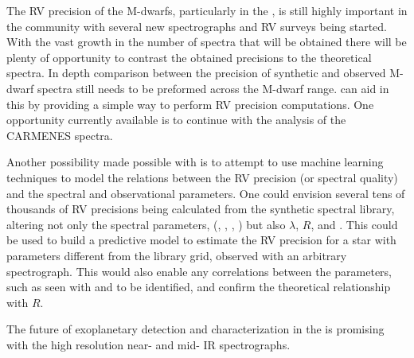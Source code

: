 The {RV} precision of the M-dwarfs, particularly in the \nir{}, is still highly important in the community with several new \nir{} spectrographs and {RV} surveys being started.
With the vast growth in the number of \nir{} spectra that will be obtained there will be plenty of opportunity to contrast the obtained precisions to the theoretical spectra.
In depth comparison between the precision of synthetic and observed M-dwarf spectra still needs to be preformed across the M-dwarf range.
\Eniric{} can aid in this by providing a simple way to perform {RV} precision computations.
One opportunity currently available is to continue with the analysis of the {CARMENES} spectra.

Another possibility made possible with \eniric{} is to attempt to use machine learning techniques to model the relations between the {RV} precision (or spectral quality) and the spectral and observational parameters.
One could envision several tens of thousands of {RV} precisions being calculated from the synthetic spectral library, altering not only the spectral parameters, (\Teff, \Logg{}, \feh{}, \alphafe{}) but also \(\lambda\), \(R\), \Vsini{} and \snr{}.
This could be used to build a predictive model to estimate the {RV} precision for a star with parameters different from the library grid, observed with an arbitrary spectrograph.
This would also enable any correlations between the parameters, such as seen with \Logg{} and \feh{} to be identified, and confirm the theoretical relationship with \(R\).

The future of exoplanetary detection and characterization in the \nir{} is promising with the high resolution near- and mid- IR spectrographs.

